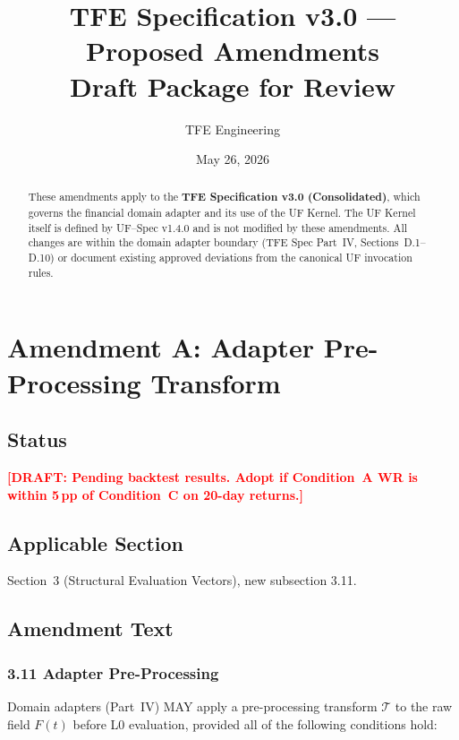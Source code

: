 \documentclass[11pt,a4paper]{article}
\title{TFE Specification v3.0 --- Proposed Amendments\\[0.5em]
\large Draft Package for Review}
\author{TFE Engineering}
\date{May 26, 2026}
\newcommand{\draft}[1]{\textcolor{red}{\textbf{[DRAFT: #1]}}}
\begin{document}
\maketitle

\begin{abstract}
These amendments apply to the \textbf{TFE Specification v3.0 (Consolidated)},
which governs the financial domain adapter and its use of the UF Kernel.
The UF Kernel itself is defined by UF--Spec v1.4.0 and is not modified by
these amendments. All changes are within the domain adapter boundary
(TFE Spec Part~IV, Sections~D.1--D.10) or document existing approved
deviations from the canonical UF invocation rules.
\end{abstract}

\tableofcontents
\newpage

\section{Amendment A: Adapter Pre-Processing Transform}
\label{sec:amendment-a}

\subsection{Status}
\draft{Pending backtest results. Adopt if Condition~A WR is within 5\,pp of Condition~C on 20-day returns.}

\subsection{Applicable Section}
Section~3 (Structural Evaluation Vectors), new subsection 3.11.

\subsection{Amendment Text}

\subsubsection*{3.11 Adapter Pre-Processing}

Domain adapters (Part~IV) MAY apply a pre-processing transform $\mathcal{T}$
to the raw field $F(t)$ before L0 evaluation, provided all of the following
conditions hold:
\end{document}
